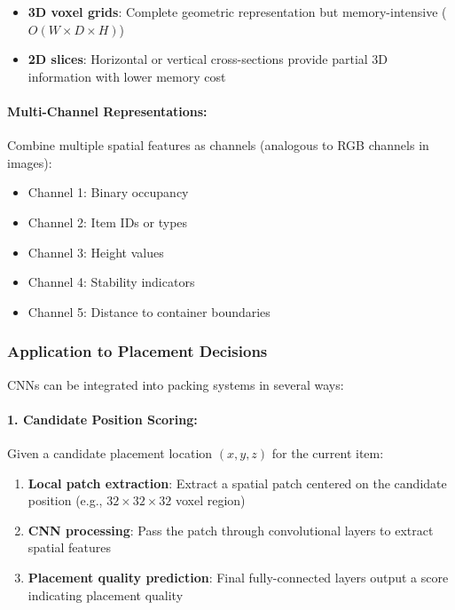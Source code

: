 \begin{itemize}
\item \textbf{3D voxel grids}: Complete geometric representation but memory-intensive ($O(W \times D \times H)$)
\item \textbf{2D slices}: Horizontal or vertical cross-sections provide partial 3D information with lower memory cost
\end{itemize}

\paragraph{Multi-Channel Representations:}

Combine multiple spatial features as channels (analogous to RGB channels in images):

\begin{itemize}
\item Channel 1: Binary occupancy
\item Channel 2: Item IDs or types
\item Channel 3: Height values
\item Channel 4: Stability indicators
\item Channel 5: Distance to container boundaries
\end{itemize}

\subsubsection{Application to Placement Decisions}

CNNs can be integrated into packing systems in several ways:

\paragraph{1. Candidate Position Scoring:}

Given a candidate placement location $(x, y, z)$ for the current item:

\begin{enumerate}
\item \textbf{Local patch extraction}: Extract a spatial patch centered on the candidate position (e.g., $32 \times 32 \times 32$ voxel region)
\item \textbf{CNN processing}: Pass the patch through convolutional layers to extract spatial features
\item \textbf{Placement quality prediction}: Final fully-connected layers output a score indicating placement quality
\end{enumerate}

